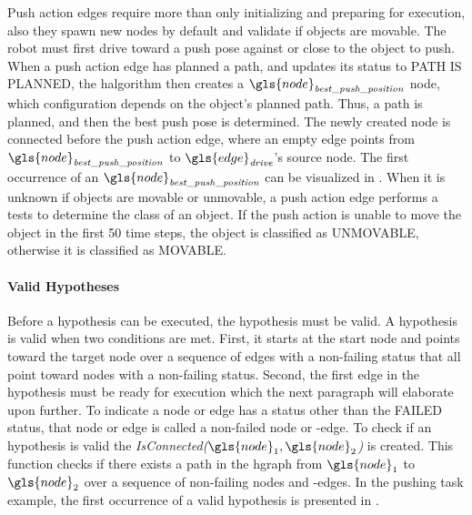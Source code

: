 Push action edges require more than only initializing and preparing for execution, also they spawn new nodes by default and validate if objects are movable. The robot must first drive toward a push pose against or close to the object to push. When a push action edge has planned a path, and updates its status to PATH IS PLANNED, the \ac{halgorithm} then creates a $\gls{node}_\mathit{best\_push\_position}$ node, which configuration depends on the object's planned path. Thus, a path is planned, and then the best push pose is determined. The newly created node is connected before the push action edge, where an empty edge points from $\gls{node}_\mathit{best\_push\_position}$ to $\gls{edge}_\mathit{drive}$'s source node. The first occurrence of an $\gls{node}_\mathit{best\_push\_position}$ can be visualized in . When it is unknown if objects are movable or unmovable, a push action edge performs a tests to determine the class of an object. If the push action is unable to move the object in the first 50 time steps, the object is classified as UNMOVABLE, otherwise it is classified as MOVABLE.\bs

\paragraph{Valid Hypotheses}
Before a hypothesis can be executed, the hypothesis must be valid. A hypothesis is valid when two conditions are met. First, it starts at the start node and points toward the target node over a sequence of edges with a non-failing status that all point toward nodes with a non-failing status. Second, the first edge in the hypothesis must be ready for execution which the next paragraph will elaborate upon further. To indicate a node or edge has a status other than the FAILED status, that node or edge is called a non-failed node or -edge. To check if an hypothesis is valid the \textit{IsConnected($\gls{node}_1, \gls{node}_2$)} is created. This function checks if there exists a path in the \ac{hgraph} from $\gls{node}_1$ to $\gls{node}_2$ over a sequence of non-failing nodes and -edges. In the pushing task example, the first occurrence of a valid hypothesis is presented in .\bs

